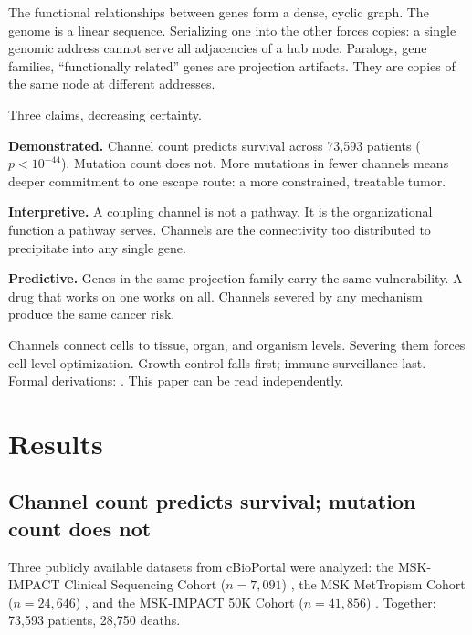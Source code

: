 \documentclass[11pt]{article}
\begin{document}
The functional relationships between genes form a dense, cyclic
graph. The genome is a linear sequence. Serializing one into the
other forces copies: a single genomic address cannot serve all
adjacencies of a hub node. Paralogs, gene families, ``functionally
related'' genes are projection artifacts. They are copies of the
same node at different addresses.

Three claims, decreasing certainty.

\textbf{Demonstrated.} Channel count predicts survival across
73{,}593 patients ($p < 10^{-44}$). Mutation count does not. More
mutations in fewer channels means deeper commitment to one escape
route: a more constrained, treatable tumor.

\textbf{Interpretive.} A coupling channel is not a pathway. It is
the organizational function a pathway serves. Channels are the
connectivity too distributed to precipitate into any single gene.

\textbf{Predictive.} Genes in the same projection family carry the
same vulnerability. A drug that works on one works on all. Channels
severed by any mechanism produce the same cancer risk.

Channels connect cells to tissue, organ, and organism levels.
Severing them forces cell level optimization. Growth control falls
first; immune surveillance last. Formal derivations:
\cite{McCarthy2026a, McCarthy2026b, McCarthy2026c, McCarthy2026d}.
This paper can be read independently.


\section*{Results}

\subsection*{Channel count predicts survival; mutation count does not}

Three publicly available datasets from cBioPortal \cite{Cerami2012}
were analyzed: the MSK-IMPACT Clinical Sequencing Cohort
($n = 7{,}091$) \cite{Zehir2017}, the MSK MetTropism Cohort
($n = 24{,}646$) \cite{Nguyen2022}, and the MSK-IMPACT 50K Cohort
($n = 41{,}856$) \cite{Bandlamudi2024}. Together: 73{,}593 patients,
28{,}750 deaths.
\end{document}
